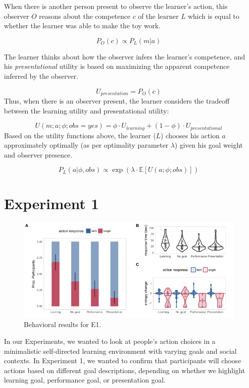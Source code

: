 \documentclass[10pt, letterpaper]{article}
\newenvironment{CodeChunk}{}{}
\begin{document}
When there is another person present to observe the learner's action,
this observer \(O\) reasons about the competence \(c\) of the learner
\(L\) which is equal to whether the learner was able to make the toy
work.

\[ P_O(c) \propto P_L(m | a)\]

The learner thinks about how the observer infers the learner's
competence, and his \emph{presentational} utility is based on maximizing
the apparent competence inferred by the observer.

\[ U_{presentation} = P_O(c) \] Thus, when there is an observer present,
the learner considers the tradeoff between the learning utility and
presentational utility:

\[ U(m;a;\phi; obs = yes) = \phi \cdot U_{learning} + (1-\phi) \cdot U_{presentational}\]
Based on the utility functions above, the learner (\(L\)) chooses his
action \(a\) approximately optimally (as per optimality parameter
\(\lambda\)) given his goal weight and observer presence.

\[ P_L(a | \phi, obs) \propto \exp(\lambda \cdot \mathbb{E}[U(a;\phi; obs)])\]

\section{Experiment 1}\label{experiment-1}

\begin{CodeChunk}
\begin{figure}[t]

{\centering \includegraphics[width=0.95\linewidth]{figs/e1_behav_results-1} 

}

\caption[Behavioral results for E1]{Behavioral results for E1.}\label{fig:e1_behav_results}
\end{figure}
\end{CodeChunk}

In our Experiments, we wanted to look at people's action choices in a
minimalistic self-directed learning environment with varying goals and
social contexts. In Experiment 1, we wanted to confirm that participants
will choose actions based on different goal descriptions, depending on
whether we highlight learning goal, performance goal, or presentation
goal.
\end{document}
